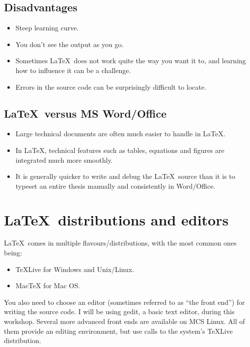 \subsection{Disadvantages}
\begin{itemize}
\item Steep learning curve.
\item You don't see the output as you go.
\item Sometimes \LaTeX\ does not work quite the way you want it to, and learning how to influence it can be a challenge.
\item Errors in the source code can be surprisingly difficult to locate.
\end{itemize}

\subsection{\LaTeX\ versus MS Word/Office}
\begin{itemize}
\item Large technical documents are often much easier to handle in \LaTeX. 
\item In \LaTeX, technical features such as tables, equations and figures are integrated much more smoothly.
\item It is generally quicker to write and debug the \LaTeX\ source than it is to typeset an entire thesis manually and consistently in Word/Office.
\end{itemize}



\section{\LaTeX\ distributions and editors}
\LaTeX\ comes in multiple flavours/distributions, with the most common ones being:
\begin{itemize}
\item TeXLive for Windows and Unix/Linux.
\item MacTeX for Mac OS.
\end{itemize}
You also need to choose an editor (sometimes referred to as ``the front end'') for writing the source code.
I will be using gedit, a basic text editor, during this workshop. Several more advanced front ends are
available on MCS Linux. All of them provide an editing environment, but use calls to the system's
TeXLive distribution.


